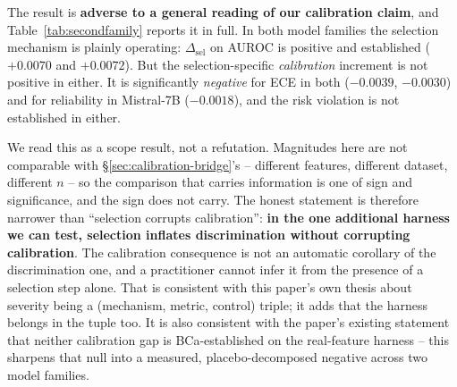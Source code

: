 \documentclass{article}
\begin{document}
The result is \textbf{adverse to a general reading of our calibration claim},
and Table~\ref{tab:secondfamily} reports it in full. In both model families the
selection mechanism is plainly operating: $\Delta_{\text{sel}}$ on AUROC is
positive and established ($+0.0070$ and $+0.0072$). But the selection-specific
\emph{calibration} increment is not positive in either. It is significantly
\emph{negative} for ECE in both ($-0.0039$, $-0.0030$) and for reliability in
Mistral-7B ($-0.0018$), and the risk violation is not established in either.

We read this as a scope result, not a refutation. Magnitudes here are not
comparable with \S\ref{sec:calibration-bridge}'s -- different features,
different dataset, different $n$ -- so the comparison that carries information
is one of sign and significance, and the sign does not carry. The honest
statement is therefore narrower than ``selection corrupts calibration'':
\textbf{in the one additional harness we can test, selection inflates
discrimination without corrupting calibration}. The calibration consequence is
not an automatic corollary of the discrimination one, and a practitioner cannot
infer it from the presence of a selection step alone. That is consistent with
this paper's own thesis about severity being a (mechanism, metric, control)
triple; it adds that the harness belongs in the tuple too. It is also
consistent with the paper's existing statement that neither calibration gap is
BCa-established on the real-feature harness -- this sharpens that null into a
measured, placebo-decomposed negative across two model families.
\end{document}
